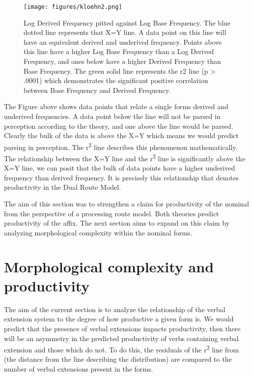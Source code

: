 \documentclass[output=paper,modfonts]{langscibook}
\begin{document}
 \begin{figure}
\texttt{[image: figures/kloehn2.png]}
\caption{Log Derived Frequency pitted against Log Base Frequency. The blue dotted line represents that X=Y line. A data point on this line will have an equivalent derived and underived frequency. Points above this line have a higher Log Base Frequency than a Log Derived Frequency, and ones below have a higher Derived Frequency than Base Frequency. The green solid line represents the r2 line (p > .0001) which demonstrates the significant positive correlation between Base Frequency and Derived Frequency.}
\label{fig:kloehn:2}
\end{figure} 

The Figure above shows data points that relate a single forms derived and underived frequencies. A data point below the line will not be parsed in perception according to the theory, and one above the line would be parsed. Clearly the bulk of the data is above the X=Y which means we would predict parsing in perception. The r\textsuperscript{2} line describes this phenomenon mathematically. The relationship between the X=Y line and the r\textsuperscript{2} line is significantly above the X=Y line, we can posit that the bulk of data points have a higher underived frequency than derived frequency. It is precisely this relationship that denotes productivity in the Dual Route Model.

The aim of this section was to strengthen a claim for productivity of the  nominal from the perspective of a  processing route model. Both theories predict productivity of the affix. The next section aims to expand on this claim by analyzing morphological complexity within the nominal forms.

\section{Morphological complexity and productivity}\label{sec:kloehn:3}


The aim of the current section is to analyze the relationship of the verbal extension system to the degree of how productive a given form is. We would predict that the presence of verbal extensions impacts productivity, then there will be an asymmetry in the predicted productivity of verbs containing verbal extension and those which do not. To do this, the residuals of the r\textsuperscript{2} line from  (the distance from the line describing the distribution) are compared to the number of verbal extensions present in the forms.
\end{document}
